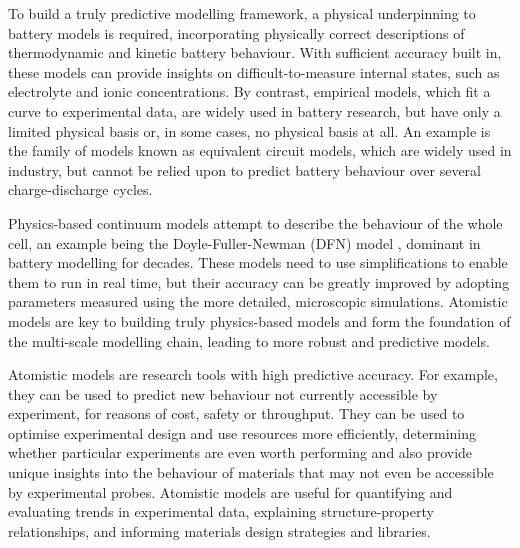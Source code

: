 \documentclass[../main.tex]{subfiles}
\begin{document}
To build a truly predictive modelling framework, a physical underpinning to battery models is required, incorporating physically correct descriptions of thermodynamic and kinetic battery behaviour. With sufficient accuracy built in, these models can provide insights on difficult-to-measure internal states, such as electrolyte and ionic concentrations. By contrast, empirical models, which fit a curve to experimental data, are widely used in battery research, but have only a limited physical basis or, in some cases, no physical basis at all. An example is the family of models known as equivalent circuit models, which are widely used in industry, but cannot be relied upon to predict battery behaviour over several charge-discharge cycles.

Physics-based continuum models attempt to describe the behaviour of the whole cell, an example being the Doyle-Fuller-Newman (DFN) model \cite{doyle1993modeling,fuller1994simulation,Fuller1994a,Doyle1995,Newman2004}, dominant in battery modelling for decades. These models need to use simplifications to enable them to run in real time, but their accuracy can be greatly improved by adopting parameters measured using the more detailed, microscopic simulations. Atomistic models are key to building truly physics-based models and form the foundation of the multi-scale modelling chain, leading to more robust and predictive models.
 
Atomistic models are research tools with high predictive accuracy. For example, they can be used to predict new behaviour not currently accessible by experiment, for reasons of cost, safety or throughput. They can be used to optimise experimental design and use resources more efficiently, determining whether particular experiments are even worth performing and also provide unique insights into the behaviour of materials that may not even be accessible by experimental probes. Atomistic models are useful for quantifying and evaluating trends in experimental data, explaining structure-property relationships, and informing materials design strategies and libraries.
\end{document}
